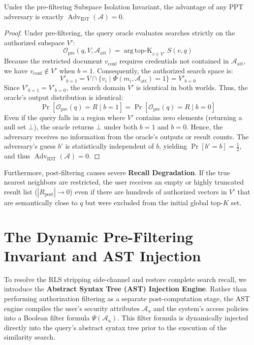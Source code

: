 \documentclass[sigconf]{acmart}
\begin{document}
\begin{theorem}
Under the pre-filtering Subspace Isolation Invariant, the advantage of any PPT adversary is exactly $\operatorname{Adv}_{\text{IDT}}(\mathcal{A}) = 0$.
\end{theorem}
\begin{proof}
Under pre-filtering, the query oracle evaluates searches strictly on the authorized subspace $V'$:
\begin{equation}
    \mathcal{O}_{\text{pre}}(q, V, \mathcal{A}_{\text{att}}) = \operatorname{arg\,top-K}_{v \in V'} S(v, q)
\end{equation}
Because the restricted document $v_{\text{conf}}$ requires credentials not contained in $\mathcal{A}_{\text{att}}$, we have $v_{\text{conf}} \notin V'$ when $b=1$. Consequently, the authorized search space is:
\begin{equation}
    V'_{b=1} = V \cap \{v_i \mid \Phi(m_i, \mathcal{A}_{\text{att}}) = 1\} = V'_{b=0}
\end{equation}
Since $V'_{b=1} = V'_{b=0}$, the search domain $V'$ is identical in both worlds. Thus, the oracle's output distribution is identical:
\begin{equation}
    \Pr[\mathcal{O}_{\text{pre}}(q) = R \mid b=1] = \Pr[\mathcal{O}_{\text{pre}}(q) = R \mid b=0]
\end{equation}
Even if the query falls in a region where $V'$ contains zero elements (returning a null set $\bot$), the oracle returns $\bot$ under both $b=1$ and $b=0$. Hence, the adversary receives no information from the oracle's outputs or result counts. The adversary's guess $b'$ is statistically independent of $b$, yielding $\Pr[b' = b] = \frac{1}{2}$, and thus $\operatorname{Adv}_{\text{IDT}}(\mathcal{A}) = 0$.
\end{proof}


Furthermore, post-filtering causes severe \textbf{Recall Degradation}. If the true nearest neighbors are restricted, the user receives an empty or highly truncated result list ($|R_{\text{post}}| \rightarrow 0$) even if there are hundreds of authorized vectors in $V'$ that are semantically close to $q$ but were excluded from the initial global top-$K$ set.

\section{The Dynamic Pre-Filtering Invariant and AST Injection}
To resolve the RLS stripping side-channel and restore complete search recall, we introduce the \textbf{Abstract Syntax Tree (AST) Injection Engine}. Rather than performing authorization filtering as a separate post-computation stage, the AST engine compiles the user's security attributes $\mathcal{A}_u$ and the system's access policies into a Boolean filter formula $\Psi(\mathcal{A}_u)$. This filter formula is dynamically injected directly into the query's abstract syntax tree prior to the execution of the similarity search.
\end{document}
